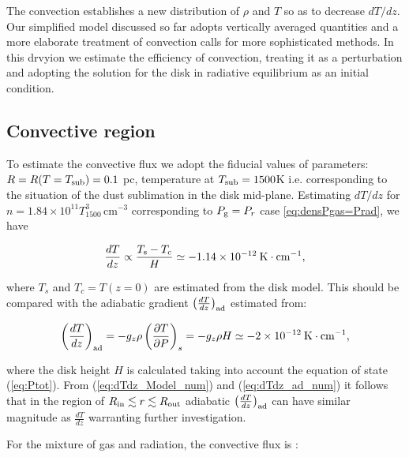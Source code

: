 \documentclass[12pt,english,preprint]{aastex}
\newcommand{\su}[2]{#1_{\rm #2}}
\newcommand{\Rout}{\su{R}{out}}
\newcommand{\Rin}{\su{R}{in}}
\newcommand{\Tsub}{ \su{T}{sub} }
\begin{document}
The convection establishes a new distribution of $\rho$ and $T$
so as to decrease $dT/dz$. 
Our simplified model discussed so far adopts vertically averaged
quantities and a 
more elaborate treatment of convection calls for more
sophisticated methods. In this drvyion  we  estimate the efficiency of convection, treating it
as a perturbation and adopting the solution for the disk in radiative equilibrium  as an initial condition.



\subsection{Convective region}

To estimate the convective flux we adopt the fiducial values of parameters:
${\displaystyle R=R(T= \Tsub)= 0.1}$ pc,
temperature at $T_{{\rm sub}}=1500$K i.e. corresponding to the
situation of the dust sublimation in the disk mid-plane. 
Estimating $dT/dz$ for
$n = 1.84\times10^{11}T_{1500}^{3}\,\text{cm}^{-3}$
corresponding to $P_{{\rm g}}=P_r$ case \eqref{eq:densPgas=Prad}, we have
 
\begin{equation}
\frac{dT}{dz}\propto\frac{T_{{\rm s}}-T_{c}}{H}\simeq-1.14\times10^{-12}\:{\rm K}\cdot{\rm cm}^{-1}\mbox{,}\label{eq:dTdz_Model_num}
\end{equation}

\noindent where $T_{s}$ and $T_{c}=T(z=0)$ are estimated from the disk model.
This should be compared with the adiabatic gradient 
$\left(\frac{dT}{dz}\right)_{{\rm ad}}$ estimated from:

\begin{equation}
\left(\frac{dT}{dz}\right)_{{\rm ad}}=
-g_{z}\rho\left(\frac{\partial T}{\partial P}\right)_{s}=-g_{z}\rho H
\simeq-2\times10^{-12}\:{\rm K}\cdot{\rm cm}^{-1}\mbox{\mbox{,}}\label{eq:dTdz_ad_num}
\end{equation}

\noindent where the disk height $H$ is calculated taking into account the equation
of state (\ref{eq:Ptot}). From
(\ref{eq:dTdz_Model_num}) and (\ref{eq:dTdz_ad_num}) it follows that
in the region of $\Rin\lesssim r\lesssim \Rout$ adiabatic
$\left(\frac{dT}{dz}\right)_{{\rm ad}}$ can have similar magnitude
as $\frac{dT}{dz}$ warranting further investigation. 

For the mixture of gas and radiation, the convective flux is \citep{KippenhahnWeigert94,BisnovatyiKogan2001book}:
\end{document}
